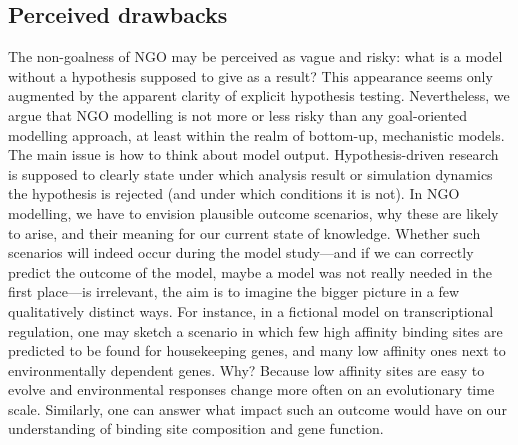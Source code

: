 \subsection{Perceived drawbacks}

The non-goalness of NGO may be perceived as vague and risky: what is a model without a hypothesis supposed to give as a result? This appearance seems only augmented by the apparent clarity of explicit hypothesis testing. Nevertheless, we argue that NGO modelling is not more or less risky than any goal-oriented modelling approach, at least within the realm of bottom-up, mechanistic models. The main issue is how to think about model output. Hypothesis-driven research is supposed to clearly state under which analysis result or simulation dynamics the hypothesis is rejected (and under which conditions it is not). In NGO modelling, we have to envision plausible outcome scenarios, why these are likely to arise, and their meaning for our current state of knowledge. Whether such scenarios will indeed occur during the model study---and if we can correctly predict the outcome of the model, maybe a model was not really needed in the first place---is irrelevant, the aim is to imagine the bigger picture in a few qualitatively distinct ways. For instance, in a fictional model on transcriptional regulation, one may sketch a scenario in which few high affinity binding sites are predicted to be found for housekeeping genes, and many low affinity ones next to environmentally dependent genes. Why? Because low affinity sites are easy to evolve and environmental responses change more often on an evolutionary time scale. Similarly, one can answer what impact such an outcome would have on our understanding of binding site composition and gene function.
